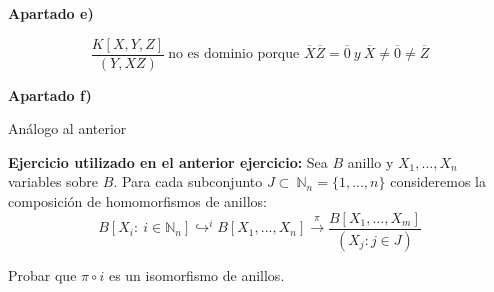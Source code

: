 \documentclass[openany]{book}
\begin{document}
\begin{exercise}
    \begin{flushright}
        \textbf{Apartado e)}
    \end{flushright}
    
    $$ \dfrac{K[X,Y,Z]}{(Y,XZ)}\ \text{no es dominio porque }\overline{X}\overline{Z} = \overline{0}\ y\  \overline{X}\ne \overline{0} \ne \overline{Z}  $$

    \begin{flushright}
        \textbf{Apartado f)}
    \end{flushright}
    
    Análogo al anterior

\end{exercise}

\textbf{Ejercicio utilizado en el anterior ejercicio:} Sea $ B $ anillo y $ X_1,...,X_n $ variables sobre $ B $. Para cada subconjunto $ J \subset\ \mathbb{N}_{n} = \{1,...,n\} $ consideremos la composición de homomorfismos de anillos:
$$ B[X_i:\ i \in \mathbb{N}_{n}] \hookrightarrow^i B[X_1,...,X_n] \xrightarrow{\pi} \dfrac{B[X_1,...,X_m]}{(X_j: j \in J)} $$

Probar que $ \pi \circ i  $ es un isomorfismo de anillos.
\end{document}
